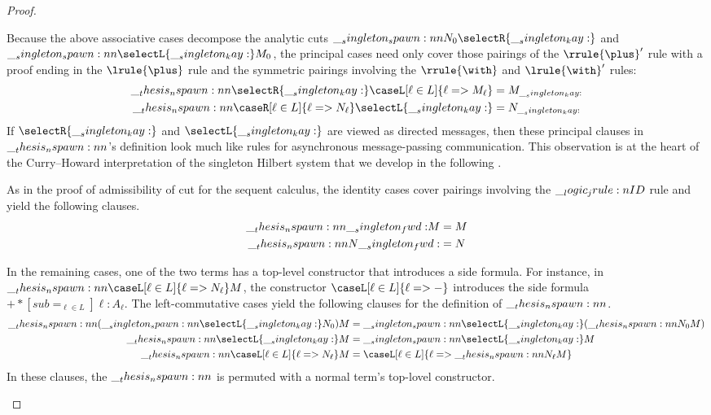 \begin{proof}
\begin{description}[listparindent=\parindent, parsep=0pt]
  \item[Principal cases]
    Because the above associative cases decompose the analytic cuts $\spawn{N_0}{\selectR{\kay}}$ and $\spawn{\selectL{\kay}}{M_0}$, the principal cases need only cover those pairings of the $\rrule{\plus}'$ rule with a proof ending in the $\lrule{\plus}$ rule and the symmetric pairings involving the $\rrule{\with}$ and $\lrule{\with}'$ rules:
    \begin{align*}
      \nspawn{\selectR{\kay}}{\caseL[\ell \in L]{\ell => M_{\ell}}}
        &= M_{\kay}
      \\
      \nspawn{\caseR[\ell \in L]{\ell => N_{\ell}}}{\selectL{\kay}}
        &= N_{\kay}
    \end{align*}
    If $\selectR{\kay}$ and $\selectL{\kay}$ are viewed as directed messages, then these principal clauses in $\nspawn{}{}$'s definition look much like rules for asynchronous message-passing communication.
    This observation is at the heart of the Curry--Howard interpretation of the singleton Hilbert system that we develop in the following .

  \item[Identity cases]
    As in the proof of admissibility of cut for the sequent calculus, the identity cases cover pairings involving the $\__logic_jrule:n {ID}$ rule and yield the following clauses.
    \begin{align*}
      \nspawn{\fwd}{M} &= M \\
      \nspawn{N}{\fwd} &= N
    \end{align*}


\item[Commutative cases]
  In the remaining cases, one of the two terms has a top-level constructor that introduces a side formula.
  For instance, in $\nspawn{\caseL[\ell \in L]{\ell => N_{\ell}}}{M}$, the constructor $\caseL[\ell \in L]{\ell => \mathord{-}}$ introduces the side formula $\plus*[sub=_{\ell \in L}]{\ell:A_{\ell}}$.
  The left-commutative cases yield the following clauses for the definition of $\nspawn{}{}$.
  \begin{align*}
    \nspawn{(\spawn{\selectL{\kay}}{N_0})}{M}
      &= \spawn{\selectL{\kay}}{(\nspawn{N_0}{M})}
    \\
    \nspawn{\selectL{\kay}}{M} &= \spawn{\selectL{\kay}}{M}
    \\
    \nspawn{\caseL[\ell \in L]{\ell => N_{\ell}}}{M}
      &= \caseL[\ell \in L]{\ell => \nspawn{N_{\ell}}{M}}
  \end{align*}
  In these clauses, the $\nspawn{}{}$ is permuted with a normal term's top-lovel constructor.


\end{description}
\end{proof}

